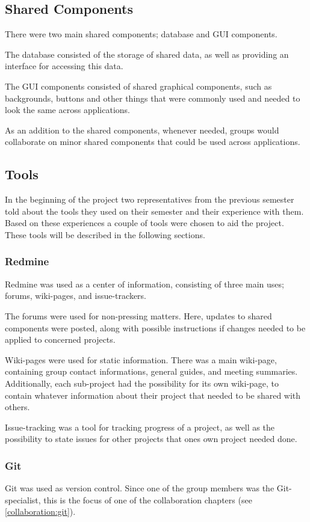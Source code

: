 \subsection{Shared Components}
There were two main shared components; database and GUI components.

The database consisted of the storage of shared data, as well as providing an interface for accessing this data.

The GUI components consisted of shared graphical components, such as backgrounds, buttons and other things that were commonly used and needed to look the same across applications.

As an addition to the shared components, whenever needed, groups would collaborate on minor shared components that could be used across applications.

\subsection{Tools}
In the beginning of the project two representatives from the previous semester told about the tools they used on their semester and their experience with them.
Based on these experiences a couple of tools were chosen to aid the project.
These tools will be described in the following sections.

\subsubsection{Redmine}
Redmine was used as a center of information, consisting of three main uses; forums, wiki-pages, and issue-trackers.

The forums were used for non-pressing matters.
Here, updates to shared components were posted, along with possible instructions if changes needed to be applied to concerned projects.

Wiki-pages were used for static information.
There was a main wiki-page, containing group contact informations, general guides, and meeting summaries.
Additionally, each sub-project had the possibility for its own wiki-page, to contain whatever information about their project that needed to be shared with others.

Issue-tracking was a tool for tracking progress of a project, as well as the possibility to state issues for other projects that ones own project needed done.

\subsubsection{Git}
Git was used as version control.
Since one of the group members was the Git-specialist, this is the focus of one of the collaboration chapters (see \ref{collaboration:git}).


